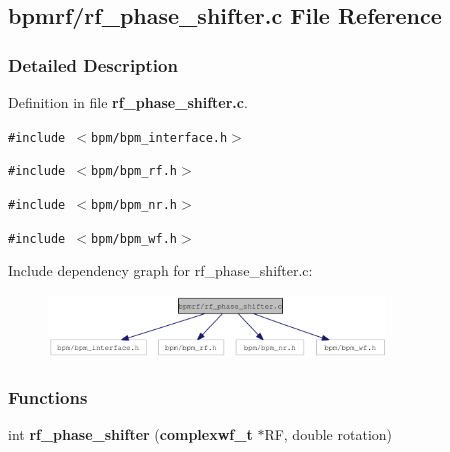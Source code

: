 \subsection{bpmrf/rf\_\-phase\_\-shifter.c File Reference}
\label{rf__phase__shifter_8c}


\subsubsection{Detailed Description}


Definition in file {\bf rf\_\-phase\_\-shifter.c}.

{\tt \#include $<$bpm/bpm\_\-interface.h$>$}\par
{\tt \#include $<$bpm/bpm\_\-rf.h$>$}\par
{\tt \#include $<$bpm/bpm\_\-nr.h$>$}\par
{\tt \#include $<$bpm/bpm\_\-wf.h$>$}\par


Include dependency graph for rf\_\-phase\_\-shifter.c:\nopagebreak
\begin{figure}[H]
\begin{center}
\leavevmode
\includegraphics[width=254pt]{rf__phase__shifter_8c__incl}
\end{center}
\end{figure}
\subsubsection*{Functions}
\begin{CompactItemize}
\item 
int {\bf rf\_\-phase\_\-shifter} ({\bf complexwf\_\-t} $\ast$RF, double rotation)
\end{CompactItemize}
